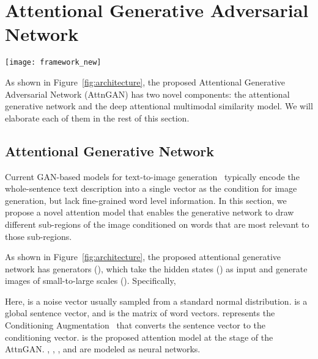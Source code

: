 \documentclass[10pt,twocolumn,letterpaper]{article}
\begin{document}
\section{Attentional Generative Adversarial Network}
\vspace{-5pt}
\begin{figure*}[tb]
\begin{center}
\texttt{[image: framework\_new]}
\end{center}
 \vspace{-10pt}
   \caption{The architecture of the proposed AttnGAN. Each attention model automatically retrieves the conditions (\ie, the most relevant word vectors) for generating different sub-regions of the image; the DAMSM provides the fine-grained image-text matching loss for the generative network.  
   }
\vspace{-10pt}
	\label{fig:architecture}
\end{figure*}
As shown in Figure~\ref{fig:architecture}, the proposed Attentional Generative Adversarial Network (AttnGAN) has two novel components: the attentional generative network and the deep attentional multimodal similarity model. We will elaborate each of them in the rest of this section. 



\subsection{Attentional Generative Network} \label{sec:Fattn}
\vspace{-5pt}
Current GAN-based models for text-to-image generation~\cite{reed2016generative,reed2016learning,Han16stackgan,Han17stackgan2} typically encode the whole-sentence text description into a single vector as the condition for image generation, but lack fine-grained word level information. In this section, we propose a novel attention model that enables the generative network to draw different sub-regions of the image conditioned on words that are most relevant to those sub-regions. 

As shown in Figure~\ref{fig:architecture}, the proposed attentional generative network has  generators (), which take the hidden states () as input and generate images of small-to-large scales (). Specifically,

Here,  is a noise vector usually sampled from a standard normal distribution.    is a global sentence vector, and  is the matrix of word vectors.    represents the Conditioning Augmentation~\cite{Han16stackgan} that converts the sentence vector  to the conditioning vector.    is the proposed attention model at the  stage of the AttnGAN.   , , , and  are modeled as neural networks. 
\end{document}
